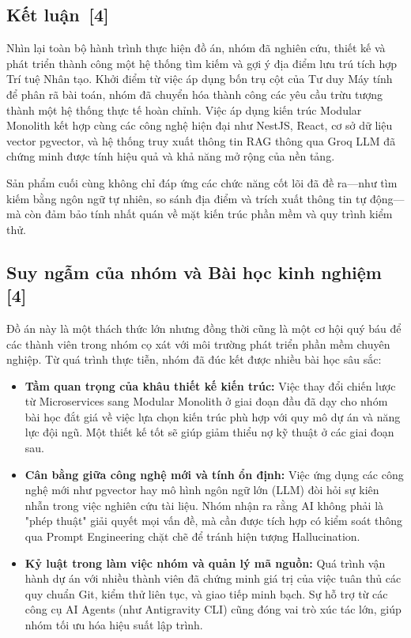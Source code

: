 \documentclass[12pt, a4paper]{article}
\begin{document}
\subsection[Kết luận]{Kết luận \,{\normalfont\small\textcolor{cyan!70!black}{[4]}}}
Nhìn lại toàn bộ hành trình thực hiện đồ án, nhóm đã nghiên cứu, thiết kế và phát triển thành công một hệ thống tìm kiếm và gợi ý địa điểm lưu trú tích hợp Trí tuệ Nhân tạo. Khởi điểm từ việc áp dụng bốn trụ cột của Tư duy Máy tính để phân rã bài toán, nhóm đã chuyển hóa thành công các yêu cầu trừu tượng thành một hệ thống thực tế hoàn chỉnh. Việc áp dụng kiến trúc Modular Monolith kết hợp cùng các công nghệ hiện đại như NestJS, React, cơ sở dữ liệu vector pgvector, và hệ thống truy xuất thông tin RAG thông qua Groq LLM đã chứng minh được tính hiệu quả và khả năng mở rộng của nền tảng. 

Sản phẩm cuối cùng không chỉ đáp ứng các chức năng cốt lõi đã đề ra---như tìm kiếm bằng ngôn ngữ tự nhiên, so sánh địa điểm và trích xuất thông tin tự động---mà còn đảm bảo tính nhất quán về mặt kiến trúc phần mềm và quy trình kiểm thử.

\subsection[Suy ngẫm của nhóm và Bài học kinh nghiệm]{Suy ngẫm của nhóm và Bài học kinh nghiệm \,{\normalfont\small\textcolor{cyan!70!black}{[4]}}}
Đồ án này là một thách thức lớn nhưng đồng thời cũng là một cơ hội quý báu để các thành viên trong nhóm cọ xát với môi trường phát triển phần mềm chuyên nghiệp. Từ quá trình thực tiễn, nhóm đã đúc kết được nhiều bài học sâu sắc:

\begin{itemize}
    \item \textbf{Tầm quan trọng của khâu thiết kế kiến trúc:} Việc thay đổi chiến lược từ Microservices sang Modular Monolith ở giai đoạn đầu đã dạy cho nhóm bài học đắt giá về việc lựa chọn kiến trúc phù hợp với quy mô dự án và năng lực đội ngũ. Một thiết kế tốt sẽ giúp giảm thiểu nợ kỹ thuật ở các giai đoạn sau.
    \item \textbf{Cân bằng giữa công nghệ mới và tính ổn định:} Việc ứng dụng các công nghệ mới như pgvector hay mô hình ngôn ngữ lớn (LLM) đòi hỏi sự kiên nhẫn trong việc nghiên cứu tài liệu. Nhóm nhận ra rằng AI không phải là "phép thuật" giải quyết mọi vấn đề, mà cần được tích hợp có kiểm soát thông qua Prompt Engineering chặt chẽ để tránh hiện tượng Hallucination.
    \item \textbf{Kỷ luật trong làm việc nhóm và quản lý mã nguồn:} Quá trình vận hành dự án với nhiều thành viên đã chứng minh giá trị của việc tuân thủ các quy chuẩn Git, kiểm thử liên tục, và giao tiếp minh bạch. Sự hỗ trợ từ các công cụ AI Agents (như Antigravity CLI) cũng đóng vai trò xúc tác lớn, giúp nhóm tối ưu hóa hiệu suất lập trình.
\end{itemize}
\end{document}
